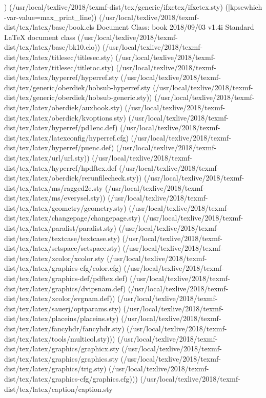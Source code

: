) (/usr/local/texlive/2018/texmf-dist/tex/generic/ifxetex/ifxetex.sty)
(|kpsewhich -var-value=max_print_line))
(/usr/local/texlive/2018/texmf-dist/tex/latex/base/book.cls
Document Class: book 2018/09/03 v1.4i Standard LaTeX document class
(/usr/local/texlive/2018/texmf-dist/tex/latex/base/bk10.clo))
(/usr/local/texlive/2018/texmf-dist/tex/latex/titlesec/titlesec.sty)
(/usr/local/texlive/2018/texmf-dist/tex/latex/titlesec/titletoc.sty)
(/usr/local/texlive/2018/texmf-dist/tex/latex/hyperref/hyperref.sty
(/usr/local/texlive/2018/texmf-dist/tex/generic/oberdiek/hobsub-hyperref.sty
(/usr/local/texlive/2018/texmf-dist/tex/generic/oberdiek/hobsub-generic.sty))
(/usr/local/texlive/2018/texmf-dist/tex/latex/oberdiek/auxhook.sty)
(/usr/local/texlive/2018/texmf-dist/tex/latex/oberdiek/kvoptions.sty)
(/usr/local/texlive/2018/texmf-dist/tex/latex/hyperref/pd1enc.def)
(/usr/local/texlive/2018/texmf-dist/tex/latex/latexconfig/hyperref.cfg)
(/usr/local/texlive/2018/texmf-dist/tex/latex/hyperref/puenc.def)
(/usr/local/texlive/2018/texmf-dist/tex/latex/url/url.sty))
(/usr/local/texlive/2018/texmf-dist/tex/latex/hyperref/hpdftex.def
(/usr/local/texlive/2018/texmf-dist/tex/latex/oberdiek/rerunfilecheck.sty))
(/usr/local/texlive/2018/texmf-dist/tex/latex/ms/ragged2e.sty
(/usr/local/texlive/2018/texmf-dist/tex/latex/ms/everysel.sty))
(/usr/local/texlive/2018/texmf-dist/tex/latex/geometry/geometry.sty)
(/usr/local/texlive/2018/texmf-dist/tex/latex/changepage/changepage.sty)
(/usr/local/texlive/2018/texmf-dist/tex/latex/paralist/paralist.sty)
(/usr/local/texlive/2018/texmf-dist/tex/latex/textcase/textcase.sty)
(/usr/local/texlive/2018/texmf-dist/tex/latex/setspace/setspace.sty)
(/usr/local/texlive/2018/texmf-dist/tex/latex/xcolor/xcolor.sty
(/usr/local/texlive/2018/texmf-dist/tex/latex/graphics-cfg/color.cfg)
(/usr/local/texlive/2018/texmf-dist/tex/latex/graphics-def/pdftex.def)
(/usr/local/texlive/2018/texmf-dist/tex/latex/graphics/dvipsnam.def)
(/usr/local/texlive/2018/texmf-dist/tex/latex/xcolor/svgnam.def))
(/usr/local/texlive/2018/texmf-dist/tex/latex/sauerj/optparams.sty)
(/usr/local/texlive/2018/texmf-dist/tex/latex/placeins/placeins.sty)
(/usr/local/texlive/2018/texmf-dist/tex/latex/fancyhdr/fancyhdr.sty)
(/usr/local/texlive/2018/texmf-dist/tex/latex/tools/multicol.sty)))
(/usr/local/texlive/2018/texmf-dist/tex/latex/graphics/graphicx.sty
(/usr/local/texlive/2018/texmf-dist/tex/latex/graphics/graphics.sty
(/usr/local/texlive/2018/texmf-dist/tex/latex/graphics/trig.sty)
(/usr/local/texlive/2018/texmf-dist/tex/latex/graphics-cfg/graphics.cfg)))
(/usr/local/texlive/2018/texmf-dist/tex/latex/caption/caption.sty
